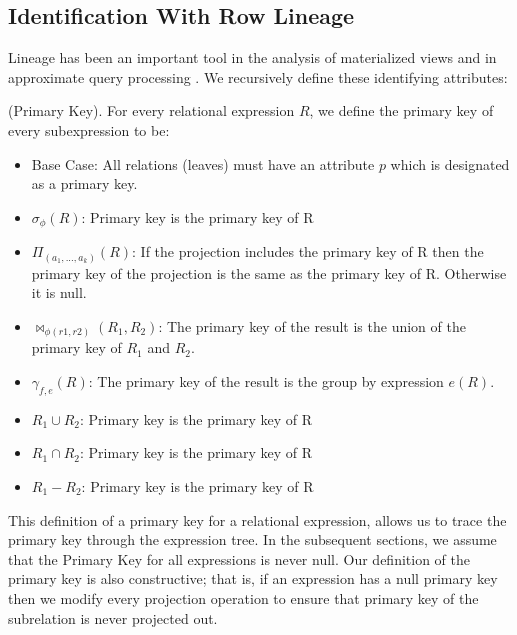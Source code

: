 \subsection{Identification With Row Lineage}
Lineage has been an important tool in the analysis of materialized views \cite{DBLP:journals/vldb/CuiW03} and in approximate query processing \cite{DBLP:conf/sigmod/ZengGMZ14}.
We recursively define these identifying attributes:
\begin{definition}
(Primary Key). For every relational expression $R$, we define the primary key of every subexpression to be:
\begin{itemize}\vspace{-.45em}
\item Base Case: All relations (leaves) must have an attribute $p$ which is designated as a primary key.\vspace{-.45em}
\item $\sigma_{\phi}(R)$: Primary key is the primary key of R \vspace{-.45em}
\item $\Pi_{(a_1,...,a_k)}(R)$: If the projection includes the primary key of R then the primary key of the projection is the same as the primary key of R. Otherwise it is \textsf{null}. \vspace{-.45em}
\item $\bowtie_{\phi (r1,r2)}(R_1,R_2)$: The primary key of the result is the union of the primary key of $R_1$ and $R_2$. 
\item $\gamma_{f,e}(R)$: The primary key of the result is the group by expression $e(R)$.\vspace{-.45em}
\item $R_1 \cup R_2$: Primary key is the primary key of R
\item $R_1 \cap R_2$: Primary key is the primary key of R
\item $R_1 - R_2$: Primary key is the primary key of R
\end{itemize}
\end{definition}
This definition of a primary key for a relational expression, allows us to trace the primary key through the expression tree.
In the subsequent sections, we assume that the Primary Key for all expressions is never null.
Our definition of the primary key is also constructive; that is, if an expression has a null primary key then we modify every projection operation to ensure that primary key of the subrelation is never projected out.

